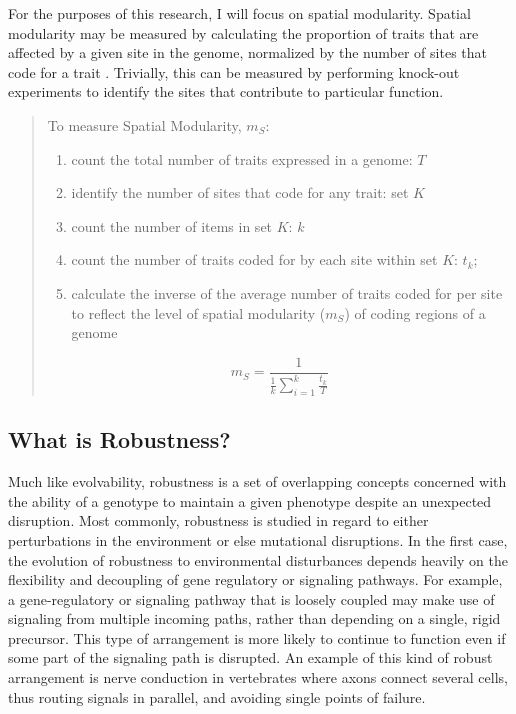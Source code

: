 \documentclass[PhD]{msu-thesis}
\begin{document}
For the purposes of this research, I will focus on spatial modularity. Spatial modularity may be measured by calculating the proportion of traits that are affected by a given site in the genome, normalized by the number of sites that code for a trait \cite{misevic_sexual_2006}. Trivially, this can be measured by performing knock-out experiments to identify the sites that contribute to particular function.

\begin{quote}
To measure Spatial Modularity, $m_S$:

\begin{enumerate}
\item count the total number of traits expressed in a genome: $T$
\item identify the number of sites that code for any trait: set $K$
\item count the number of items in set $K$: $k$
\item count the number of traits coded for by each site within set $K$: $t_k$;
\item calculate the inverse of the average number of traits coded for per site to reflect the level of spatial modularity ($m_S$) of coding regions of a genome
\end{enumerate}
\begin{equation}
m_S = \frac{1}{\frac{1}{k} {\sum_{i=1}^{k} \frac{t_{k}}{T}}} 
\end{equation}
\end{quote}




\subsection{What is Robustness?}
Much like evolvability, robustness is a set of overlapping concepts concerned with the ability of a genotype to maintain a given phenotype despite an unexpected disruption\cite{kitano_biological_2004,visser_perspective:_2003}. Most commonly, robustness is studied in regard to either perturbations in the environment or else mutational disruptions. In the first case, the evolution of robustness to environmental disturbances depends heavily on the flexibility and decoupling of gene regulatory or signaling pathways\cite{kirschner_evolvability_1998}. For example, a gene-regulatory or signaling pathway that is loosely coupled may make use of signaling from multiple incoming paths, rather than depending on a single, rigid precursor. This type of arrangement is more likely to continue to function even if some part of the signaling path is disrupted. An example of this kind of robust arrangement is nerve conduction in vertebrates where axons connect several cells, thus routing signals in parallel, and avoiding single points of failure\cite{kirschner_evolvability_1998}.
\end{document}
